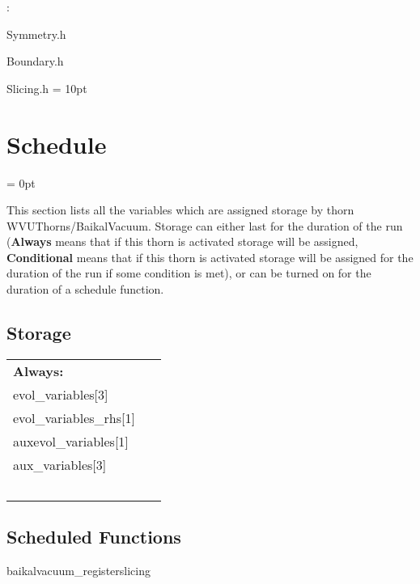 \vspace{5mm}

: 

Symmetry.h

Boundary.h

Slicing.h
\vspace{2mm}\parskip = 10pt 

\section{Schedule} 


\parskip = 0pt


\noindent This section lists all the variables which are assigned storage by thorn WVUThorns/BaikalVacuum.  Storage can either last for the duration of the run ({\bf Always} means that if this thorn is activated storage will be assigned, {\bf Conditional} means that if this thorn is activated storage will be assigned for the duration of the run if some condition is met), or can be turned on for the duration of a schedule function.


\subsection*{Storage}

\hspace{5mm}

 \begin{tabular*}{160mm}{ll} 

{\bf Always:}&  ~ \\ 
 evol\_variables[3] & ~\\ 
 evol\_variables\_rhs[1] & ~\\ 
 auxevol\_variables[1] & ~\\ 
 aux\_variables[3] & ~\\ 
~ & ~\\ 
\end{tabular*} 


\subsection*{Scheduled Functions}
\vspace{5mm}


\hspace{5mm} baikalvacuum\_registerslicing 

\hspace{5mm}{\it register 3+1 slicing condition } 


